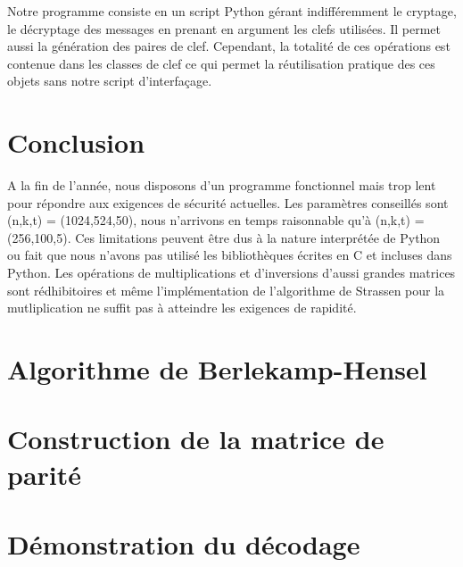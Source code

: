 \documentclass{article}
\begin{document}
			Notre programme consiste en un script Python gérant indifféremment le cryptage, le décryptage des messages en prenant en argument les clefs utilisées.
			Il permet aussi la génération des paires de clef.
			Cependant, la totalité de ces opérations est contenue dans les classes de clef ce qui permet la réutilisation pratique des ces objets sans notre script d’interfaçage.

	\section{Conclusion}

		A la fin de l'année, nous disposons d'un programme fonctionnel mais trop lent pour répondre aux exigences de sécurité actuelles.
		Les paramètres conseillés sont (n,k,t) = (1024,524,50), nous n'arrivons en temps raisonnable qu'à (n,k,t) = (256,100,5).
		Ces limitations peuvent être dus à la nature interprétée de Python ou fait que nous n'avons pas utilisé les bibliothèques écrites en C et incluses dans Python.
		Les opérations de multiplications et d'inversions d'aussi grandes matrices sont rédhibitoires et même l'implémentation de l'algorithme de Strassen pour la mutliplication ne suffit pas à atteindre les exigences de rapidité.





\appendix
	
	\section{Algorithme de Berlekamp-Hensel}
		\label{BH}

	\section{Construction de la matrice de parité}
		\label{parite}

	\section{Démonstration du décodage}
		\label{eqclef}





\end{document}
